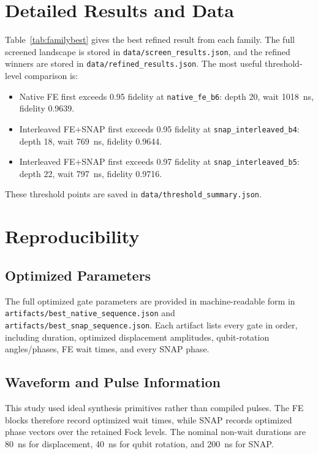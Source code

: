\documentclass[aps,pra,twocolumn,reprint,amsmath,amssymb]{revtex4-2}
\begin{document}



\appendix

\section{Detailed Results and Data}
Table~\ref{tab:familybest} gives the best refined result from each family. The
full screened landscape is stored in
\texttt{data/screen\_results.json}, and the refined winners are stored in
\texttt{data/refined\_results.json}. The most useful threshold-level comparison
is:
\begin{itemize}
  \item Native FE first exceeds 0.95 fidelity at \texttt{native\_fe\_b6}:
  depth 20, wait \SI{1018}{ns}, fidelity 0.9639.
  \item Interleaved FE+SNAP first exceeds 0.95 fidelity at
  \texttt{snap\_interleaved\_b4}: depth 18, wait \SI{769}{ns}, fidelity 0.9644.
  \item Interleaved FE+SNAP first exceeds 0.97 fidelity at
  \texttt{snap\_interleaved\_b5}: depth 22, wait \SI{797}{ns}, fidelity 0.9716.
\end{itemize}
These threshold points are saved in \texttt{data/threshold\_summary.json}.

\section{Reproducibility}
\subsection{Optimized Parameters}
The full optimized gate parameters are provided in machine-readable form in
\texttt{artifacts/best\_native\_sequence.json} and
\texttt{artifacts/best\_snap\_sequence.json}. Each artifact lists every gate in
order, including duration, optimized displacement amplitudes, qubit-rotation
angles/phases, FE wait times, and every SNAP phase.

\subsection{Waveform and Pulse Information}
This study used ideal synthesis primitives rather than compiled pulses. The FE
blocks therefore record optimized wait times, while SNAP records optimized phase
vectors over the retained Fock levels. The nominal non-wait durations are
\SI{80}{ns} for displacement, \SI{40}{ns} for qubit rotation, and \SI{200}{ns}
for SNAP.
\end{document}
